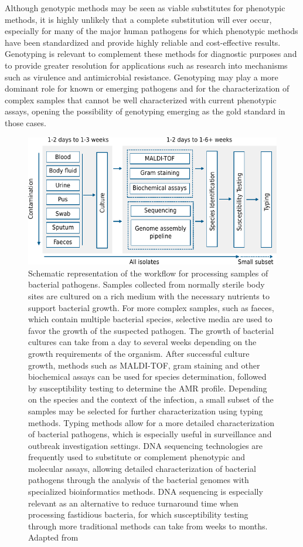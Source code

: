 Although genotypic methods may be seen as viable substitutes for phenotypic methods, it is highly unlikely that a complete substitution will ever occur, especially for many of the major human pathogens for which phenotypic methods have been standardized and provide highly reliable and cost-effective results. Genotyping is relevant to complement these methods for diagnostic purposes and to provide greater resolution for applications such as research into mechanisms such as virulence and antimicrobial resistance. Genotyping may play a more dominant role for known or emerging pathogens and for the characterization of complex samples that cannot be well characterized with current phenotypic assays, opening the possibility of genotyping emerging as the gold standard in those cases.

\begin{figure}[!ht]
    \centering
    \includegraphics[angle=0,width=\textwidth]{figures/introduction/Figure3.pdf}
    \caption[Schematic representation of the workflow for processing samples of bacterial pathogens.]{Schematic representation of the workflow for processing samples of bacterial pathogens. Samples collected from normally sterile body sites are cultured on a rich medium with the necessary nutrients to support bacterial growth. For more complex samples, such as faeces, which contain multiple bacterial species, selective media are used to favor the growth of the suspected pathogen. The growth of bacterial cultures can take from a day to several weeks depending on the growth requirements of the organism. After successful culture growth, methods such as \ac{MALDI-TOF}, gram staining and other biochemical assays can be used for species determination, followed by susceptibility testing to determine the \ac{AMR} profile. Depending on the species and the context of the infection, a small subset of the samples may be selected for further characterization using typing methods. Typing methods allow for a more detailed characterization of bacterial pathogens, which is especially useful in surveillance and outbreak investigation settings. DNA sequencing technologies are frequently used to substitute or complement phenotypic and molecular assays, allowing detailed characterization of bacterial pathogens through the analysis of the bacterial genomes with specialized bioinformatics methods. DNA sequencing is especially relevant as an alternative to reduce turnaround time when processing fastidious bacteria, for which susceptibility testing through more traditional methods can take from weeks to months. Adapted from \cite{didelot_transforming_2012, mendes_towards_2023}}

\end{figure}
